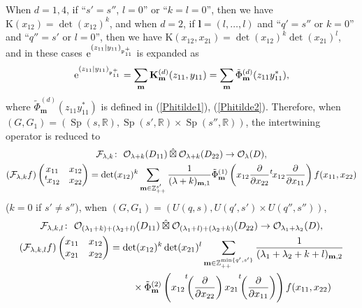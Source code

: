 \documentclass[pdftex]{sigma}
\numberwithin{equation}{section}
\newcommand{\bK}{\mathbf{K}}
\newcommand{\bl}{\mathbf{l}}
\newcommand{\bm}{\mathbf{m}}
\newcommand{\BZ}{\mathbb{Z}}
\newcommand{\BR}{\mathbb{R}}
\newcommand{\fp}{\mathfrak{p}}
\newcommand{\cF}{\mathcal{F}}
\newcommand{\cO}{\mathcal{O}}
\newcommand{\rK}{\mathrm{K}}
\newcommand{\hboxtimes}{\mathbin{\hat{\boxtimes}}}
\begin{document}
When $d=1,4$, if ``$s'=s''$, $l=0$'' or ``$k=l=0$'', then we have $\rK(x_{12})=\det(x_{12})^k$,
and when $d=2$, if $\bl=(l,\ldots,l)$ and ``$q'=s''$ or $k=0$'' and ``$q''=s'$ or $l=0$'',
then we have $\rK(x_{12},x_{21})=\det(x_{12})^k\det(x_{21})^l$, and in these cases ${\rm e}^{(z_{11}|y_{11})_{\fp^+_{11}}}$ is expanded as
\begin{gather*} {\rm e}^{(z_{11}|y_{11})_{\fp^+_{11}}}=\sum_{\bm}\bK_\bm^{(d)}(z_{11},y_{11})=\sum_{\bm}\tilde{\Phi}_\bm^{(d)}(z_{11}y_{11}^*), \end{gather*}
where $\tilde{\Phi}_\bm^{(d)}(z_{11}y_{11}^*)$ is defined in (\ref{Phitilde1}), (\ref{Phitilde2}).
Therefore, when $(G,G_1)=(\operatorname{Sp}(s,\BR), \operatorname{Sp}(s',\BR)\times \operatorname{Sp}(s'',\BR))$, the intertwining operator is reduced to
\begin{gather}
\cF_{\lambda,k}\colon \ \cO_{\lambda+k}(D_{11}) \hboxtimes \cO_{\lambda+k}(D_{22})\to \cO_{\lambda}(D), \label{Sp-SpSp} \\
(\cF_{\lambda,k}f)\begin{pmatrix}x_{11}&x_{12}\\{}^t\hspace{-1pt}x_{12}&x_{22}\end{pmatrix}
=\det(x_{12})^k\sum_{\bm\in\BZ_{++}^{s'}}\frac{1}{(\lambda+k)_{\bm,1}}
\tilde{\Phi}_\bm^{(1)}\left(x_{12}\frac{\partial}{\partial x_{22}}{}^t\hspace{-1pt}x_{12}\frac{\partial}{\partial x_{11}}\right)f(x_{11},x_{22})\notag
\end{gather}
($k=0$ if $s'\ne s''$), when $(G,G_1)=(U(q,s),U(q',s')\times U(q'',s''))$,
\begin{gather}
\cF_{\lambda,k,l}\colon \ \cO_{(\lambda_1+k)+(\lambda_2+l)}(D_{11}) \hboxtimes \cO_{(\lambda_1+l)+(\lambda_2+k)}(D_{22})
\to \cO_{\lambda_1+\lambda_2}(D), \notag \\
(\cF_{\lambda,k,l}f)\begin{pmatrix}x_{11}&x_{12}\\x_{21}&x_{22}\end{pmatrix}
 =\det(x_{12})^k\det(x_{21})^l
\sum_{\bm\in\BZ_{++}^{\min\{q',s'\}}}\frac{1}{(\lambda_1+\lambda_2+k+l)_{\bm,2}}\notag \\
\hphantom{(\cF_{\lambda,k,l}f)\begin{pmatrix}x_{11}&x_{12}\\x_{21}&x_{22}\end{pmatrix}=}{}
\times\tilde{\Phi}_\bm^{(2)}
\left(x_{12}{\vphantom{\biggl(}}^t\!\!\left(\frac{\partial}{\partial x_{22}}\right)x_{21}
{\vphantom{\biggl(}}^t\!\!\left(\frac{\partial}{\partial x_{11}}\right)\right)f(x_{11},x_{22})
\label{U-UU}
\end{gather}
\end{document}
